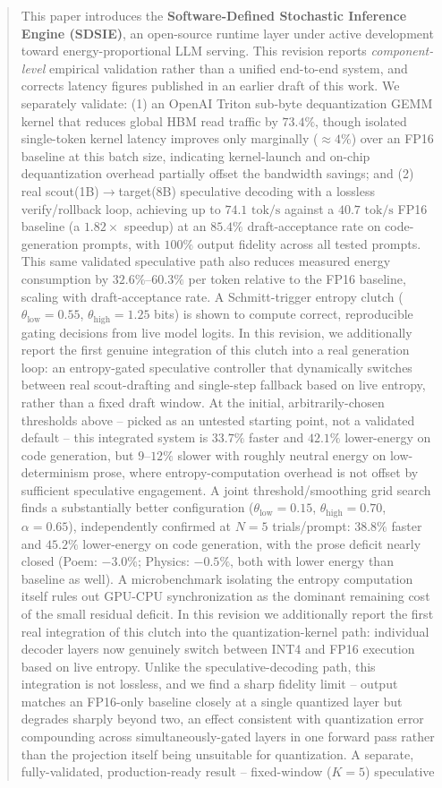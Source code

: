 \documentclass[10pt,journal,compsoc,twocolumn]{IEEEtran}
\begin{document}
{\begin{abstract}
This paper introduces the \textbf{Software-Defined Stochastic Inference Engine (SDSIE)}, an open-source runtime layer under active development toward energy-proportional LLM serving. This revision reports \textit{component-level} empirical validation rather than a unified end-to-end system, and corrects latency figures published in an earlier draft of this work. We separately validate: (1) an OpenAI Triton sub-byte dequantization GEMM kernel that reduces global HBM read traffic by $73.4\%$, though isolated single-token kernel latency improves only marginally ($\approx 4\%$) over an FP16 baseline at this batch size, indicating kernel-launch and on-chip dequantization overhead partially offset the bandwidth savings; and (2) real scout(1B)$\to$target(8B) speculative decoding with a lossless verify/rollback loop, achieving up to $74.1\text{ tok/s}$ against a $40.7\text{ tok/s}$ FP16 baseline (a $1.82\times$ speedup) at an $85.4\%$ draft-acceptance rate on code-generation prompts, with $100\%$ output fidelity across all tested prompts. This same validated speculative path also reduces measured energy consumption by $32.6\%$--$60.3\%$ per token relative to the FP16 baseline, scaling with draft-acceptance rate. A Schmitt-trigger entropy clutch ($\theta_{\text{low}}=0.55$, $\theta_{\text{high}}=1.25$ bits) is shown to compute correct, reproducible gating decisions from live model logits. In this revision, we additionally report the first genuine integration of this clutch into a real generation loop: an entropy-gated speculative controller that dynamically switches between real scout-drafting and single-step fallback based on live entropy, rather than a fixed draft window. At the initial, arbitrarily-chosen thresholds above -- picked as an untested starting point, not a validated default -- this integrated system is $33.7\%$ faster and $42.1\%$ lower-energy on code generation, but $9$--$12\%$ slower with roughly neutral energy on low-determinism prose, where entropy-computation overhead is not offset by sufficient speculative engagement. A joint threshold/smoothing grid search finds a substantially better configuration ($\theta_{\text{low}}=0.15$, $\theta_{\text{high}}=0.70$, $\alpha=0.65$), independently confirmed at $N{=}5$ trials/prompt: $38.8\%$ faster and $45.2\%$ lower-energy on code generation, with the prose deficit nearly closed (Poem: $-3.0\%$; Physics: $-0.5\%$, both with lower energy than baseline as well). A microbenchmark isolating the entropy computation itself rules out GPU-CPU synchronization as the dominant remaining cost of the small residual deficit. In this revision we additionally report the first real integration of this clutch into the quantization-kernel path: individual decoder layers now genuinely switch between INT4 and FP16 execution based on live entropy. Unlike the speculative-decoding path, this integration is not lossless, and we find a sharp fidelity limit -- output matches an FP16-only baseline closely at a single quantized layer but degrades sharply beyond two, an effect consistent with quantization error compounding across simultaneously-gated layers in one forward pass rather than the projection itself being unsuitable for quantization. A separate, fully-validated, production-ready result -- fixed-window ($K{=}5$) speculative 
\end{abstract}}
\end{document}
